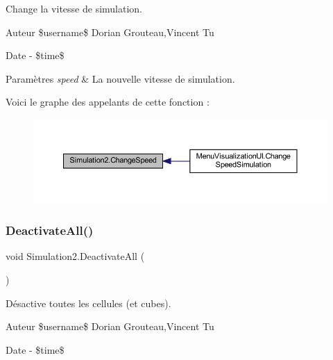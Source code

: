 Change la vitesse de simulation. 

\begin{DoxyAuthor}{Auteur}
\$username\$ Dorian Grouteau,Vincent Tu 
\end{DoxyAuthor}
\begin{DoxyDate}{Date}
-\/ \$time\$ 
\begin{DoxyParams}{Paramètres}
{\em speed} & La nouvelle vitesse de simulation.\\
\hline
\end{DoxyParams}

\end{DoxyDate}
Voici le graphe des appelants de cette fonction \+:\nopagebreak
\begin{figure}[H]
\begin{center}
\leavevmode
\includegraphics[width=350pt]{class_simulation2_ad962236b5b5316310e2db253a6ffecee_icgraph}
\end{center}
\end{figure}
\mbox{\label{class_simulation2_a71a0bbd4c453b30461173f6fc5f1ea86}} 
\subsubsection{\texorpdfstring{Deactivate\+All()}{DeactivateAll()}}
{\footnotesize\ttfamily void Simulation2.\+Deactivate\+All (\begin{DoxyParamCaption}{ }\end{DoxyParamCaption})\hspace{0.3cm}{\ttfamily [inline]}}



Désactive toutes les cellules (et cubes). 

\begin{DoxyAuthor}{Auteur}
\$username\$ Dorian Grouteau,Vincent Tu 
\end{DoxyAuthor}
\begin{DoxyDate}{Date}
-\/ \$time\$ 
\end{DoxyDate}
\mbox{\label{class_simulation2_ac1bb1640dae3927d80ec43c8f7707759}} 
